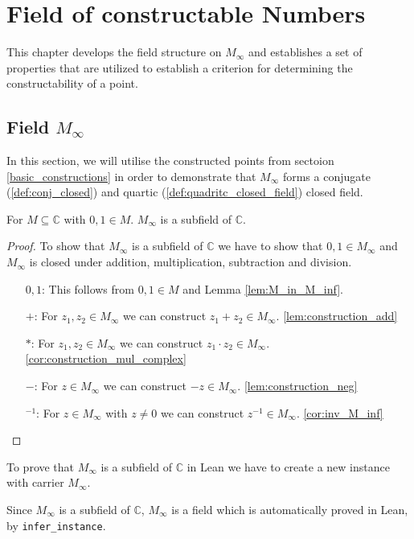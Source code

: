 \chapter{Field of constructable Numbers}
This chapter develops the field structure on $M_{\infty}$ and establishes a set of properties that are utilized to establish a criterion for determining the constructability of a point.
\section[Filed of Constructable Numbers]{Field $M_{\infty}$}
In this section, we will utilise the constructed points from sectoion \ref{basic_constructions} in order to demonstrate that $M_{\infty}$ forms a conjugate (\ref{def:conj_closed}) and quartic (\ref{def:quadritc_closed_field}) closed field.

\begin{theorem}
    \label{thm:MField}
    \leanok
    For $M\subseteq \mathbb{C}$ with $0,1 \in M$. $M_{\infty}$ is a subfield of $\mathbb{C}$.
\end{theorem}
\begin{proof}
    \leanok
    To show that $M_{\infty}$ is a subfield of $\mathbb{C}$ we have to show that $0,1\in M_{\infty}$ and $M_{\infty}$ is closed under addition, multiplication, subtraction and division.
    \begin{itemize}
        \item [$0,1$:] This follows from $0,1 \in M$ and Lemma \ref{lem:M_in_M_inf}.
        \item [$+$:] For $z_1,z_2 \in M_{\infty}$ we can construct $z_1 + z_2 \in M_{\infty}$. \ref{lem:construction_add}
        \item [$*$:] For $z_1,z_2 \in M_{\infty}$ we can construct $z_1 \cdot z_2 \in M_{\infty}$. \ref{cor:construction_mul_complex}
        \item [$-$:] For $z \in M_{\infty}$ we can construct $-z \in M_{\infty}$. \ref{lem:construction_neg}
        \item [$^{-1}$:] For $z \in M_{\infty}$ with $z \ne 0$ we can construct $z^{-1} \in M_{\infty}$. \ref{cor:inv_M_inf}
    \end{itemize}
\end{proof}

\begin{remark}
   To prove that $M_{\infty}$ is a subfield of $\mathbb{C}$ in Lean we have to create a new instance with carrier $M_{\infty}$.
\end{remark}
\begin{remark}
    \label{rem:MField_Field}
    Since $M_{\infty}$ is a subfield of $\mathbb{C}$, $M_{\infty}$ is a field which is automatically proved in Lean, by \lstinline{infer_instance}.
\end{remark}


